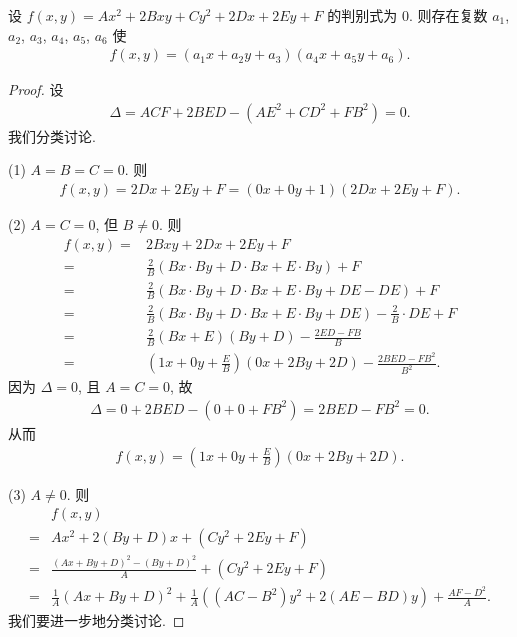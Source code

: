 \documentclass[../libro.tex]{subfiles}
\begin{document}
\begin{theorem}
    设 \(f(x, y) = Ax^2 + 2Bxy + Cy^2 + 2Dx + 2Ey + F\)
    的判别式为 \(0\).
    则存在复数
    \(a_1\), \(a_2\), \(a_3\), \(a_4\), \(a_5\), \(a_6\)
    使
    \begin{align*}
        f(x, y) = (a_1 x + a_2 y + a_3) (a_4 x + a_5 y + a_6).
    \end{align*}
\end{theorem}

\begin{proof}
    设
    \begin{align*}
        \Delta = ACF + 2BED - (AE^2 + CD^2 + FB^2) = 0.
    \end{align*}
    我们分类讨论.

    (1)
    \(A = B = C = 0\).
    则
    \begin{align*}
        f(x, y)
        = 2Dx + 2Ey + F
        = (0x + 0y + 1)(2Dx + 2Ey + F).
    \end{align*}

    (2)
    \(A = C = 0\), 但 \(B \neq 0\).
    则
    \begin{align*}
        f(x, y)
        = {} & 2Bxy + 2Dx + 2Ey + F                                                               \\
        = {} & \frac{2}{B}(Bx \cdot By + D \cdot Bx + E \cdot By) + F                             \\
        = {} & \frac{2}{B}(Bx \cdot By + D \cdot Bx + E \cdot By + DE - DE) + F                   \\
        = {} & \frac{2}{B}(Bx \cdot By + D \cdot Bx + E \cdot By + DE) - \frac{2}{B} \cdot DE + F \\
        = {} & \frac{2}{B}(Bx + E)(By + D) - \frac{2ED - FB}{B}                                   \\
        = {} & \left(1x + 0y + \frac{E}{B}\right)(0x + 2By + 2D) - \frac{2BED - FB^2}{B^2}.
    \end{align*}
    因为 \(\Delta = 0\), 且 \(A = C = 0\), 故
    \begin{align*}
        \Delta = 0 + 2BED - (0 + 0 + FB^2) = 2BED - FB^2 = 0.
    \end{align*}
    从而
    \begin{align*}
        f(x, y) = \left(1x + 0y + \frac{E}{B}\right)(0x + 2By + 2D).
    \end{align*}

    (3)
    \(A \neq 0\).
    则
    \begin{align*}
        &
        f(x, y)
        \\
        = {} &
        Ax^2 + 2(By + D)x + (Cy^2 + 2Ey + F)
        \\
        = {} &
        \frac{(Ax + By + D)^2 - (By + D)^2}{A} + (Cy^2 + 2Ey + F)
        \\
        = {} &
        \frac{1}{A} (Ax + By + D)^2 + \frac{1}{A}((AC - B^2)y^2 + 2(AE - BD)y) + \frac{AF - D^2}{A}.
    \end{align*}
    我们要进一步地分类讨论.


\end{proof}
\end{document}
